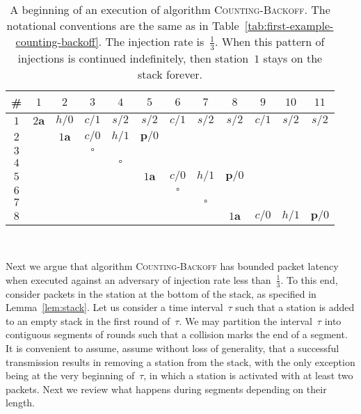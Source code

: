 \documentclass[11pt]{article}
\newlength{\pagewidth}
\newcommand{\RB}{\raisebox{2.5ex}{~}}
\newcommand{\LB}{\raisebox{-1.5ex}{~}}
\begin{document}
\begin{table}[t]
\begin{center}
\begin{tabular}{| c ||c |c |c |c |c | c | c | c | c | c | c |  }
\hline
\RB \LB
\# & $1$ & $2$ & $3$ &$4$&$5$& $6$ & $7$& $8$& $9$ & $10$ & $11$  \\
\hline\hline
\RB \LB
$1$& $2\boldsymbol{a}$  & $h/0$ & $c/1$ & $s/2$& $s/2$&$c/1$& $s/2$& $s/2$& $c/1$ &$s/2$&$s/2$\\
\hline
\RB \LB
$2$ & & $1\boldsymbol{a}$ & $c/0$ &$h/1$& $\boldsymbol{p}/0$& & &&&&\\
\hline
\RB \LB
$3$ & & & $\boldsymbol{\square}$  & & & &&& &&\\
\hline
\RB \LB
$4$ & & && $\boldsymbol{\square}$ & &&&& &&\\
\hline
\RB \LB
$5$ & & &&&$1\boldsymbol{a}$ &$c/0$&$h/1$&$\boldsymbol{p}/0$& &&\\
\hline
\RB \LB
$6$ & & &&  & &$\boldsymbol{\square}$&&& &&\\
\hline
\RB \LB
$7$ & & &&  & &&$\boldsymbol{\square}$&& &&\\
\hline
\RB \LB
$8$ & & &&  & &&& $1\boldsymbol{a}$ & $c/0$&$h/1$&$\boldsymbol{p}/0$\\
\hline
\end{tabular}
\parbox{\pagewidth}{
~
\caption{\label{tab:example-counting-backoff-lack-fairness}
A beginning of an execution of algorithm \textsc{Counting-Backoff}.
The notational conventions are the same as in Table~\ref{tab:first-example-counting-backoff}.
The injection rate is~$\frac{1}{3}$.
When this pattern of injections is continued indefinitely, then station~$1$ stays on the stack forever.
}}
\end{center}
\end{table}


Next we argue that algorithm \textsc{Counting-Backoff} has bounded packet latency when executed against an  adversary of  injection rate less than~$\frac{1}{3}$.
To this end, consider packets in the station at the bottom of the stack, as specified in Lemma~\ref{lem:stack}.
Let us consider a time interval~$\tau$ such that a station is added to an empty stack in the first round of~$\tau$.
We may partition the interval~$\tau$ into contiguous segments of rounds such that a collision marks  the end of a segment.
It is convenient to assume, assume without loss of generality, that a successful transmission results in removing a station from the stack, with the only exception being at the very beginning of~$\tau$, in which a station is activated with at least two packets.
Next we review what happens during segments depending on their length.
\end{document}
